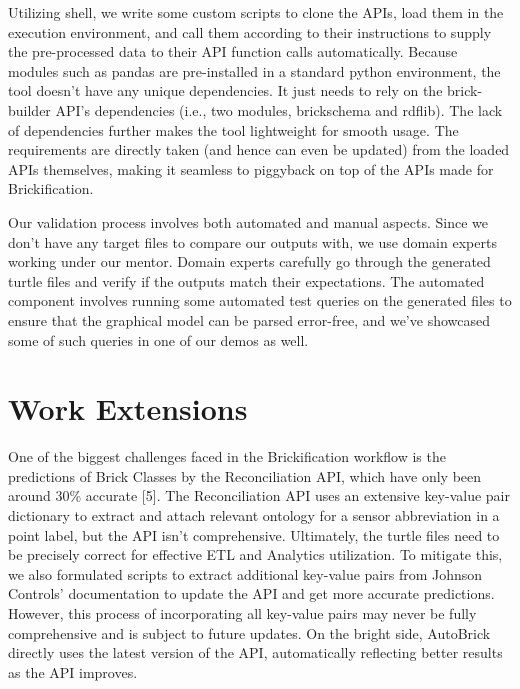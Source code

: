 \documentclass[twocolumn, switch]{article} %
\begin{document}
	Utilizing shell, we write some custom scripts to clone the APIs, load them in the execution environment, and call them according to their instructions to supply the pre-processed data to their API function calls automatically.  
	Because modules such as pandas are pre-installed in a standard python environment, the tool doesn’t have any unique dependencies. It just needs to rely on the brick-builder API’s dependencies (i.e., two modules, brickschema and rdflib). The lack of dependencies further makes the tool lightweight for smooth usage. The requirements are directly taken (and hence can even be updated) from the loaded APIs themselves, making it seamless to piggyback on top of the APIs made for Brickification.


Our validation process involves both automated and manual aspects. Since we don't have any target files to compare our outputs with, we use domain experts working under our mentor. Domain experts carefully go through the generated turtle files and verify if the outputs match their expectations. The automated component involves running some automated test queries on the generated files to ensure that the graphical model can be parsed error-free, and we’ve showcased some of such queries in one of our demos as well.

\section{Work Extensions}
One of the biggest challenges faced in the Brickification workflow is the
predictions of Brick Classes by the Reconciliation API, which have only been
around 30\% accurate [5]. The Reconciliation API uses an extensive key-value pair dictionary to extract and attach relevant ontology for a sensor abbreviation in a point label, but the API isn’t comprehensive. Ultimately, the turtle files need to be precisely correct for effective ETL and Analytics utilization. To mitigate this, we also formulated scripts to extract additional key-value pairs from Johnson Controls’ documentation to update the API and get more accurate predictions. However, this process of incorporating all key-value pairs may never be fully comprehensive and is subject to future updates. On the bright side, AutoBrick directly uses the latest version of the API, automatically reflecting better results as the API improves. 
\end{document}
